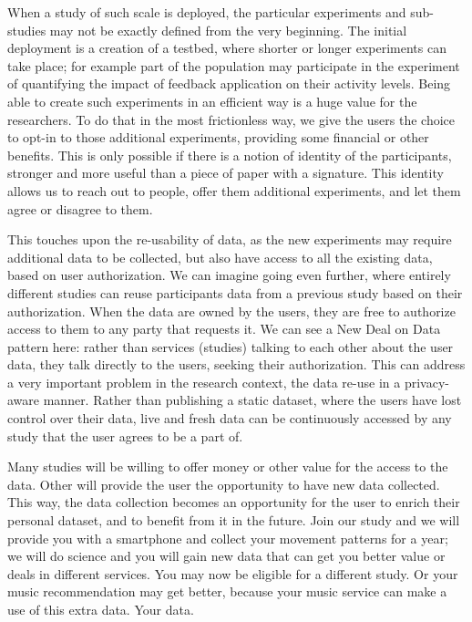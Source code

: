 When a study of such scale is deployed, the particular experiments and sub-studies may not be exactly defined from the very beginning.
The initial deployment is a creation of a testbed, where shorter or longer experiments can take place; for example part of the population may participate in the experiment of quantifying the impact of feedback application on their activity levels.
Being able to create such experiments in an efficient way is a huge value for the researchers. To do that in the most frictionless way, we give the users the choice to opt-in to those additional experiments, providing some financial or other benefits.
This is only possible if there is a notion of identity of the participants, stronger and more useful than a piece of paper with a signature.
This identity allows us to reach out to people, offer them additional experiments, and let them agree or disagree to them.

This touches upon the re-usability of data, as the new experiments may require additional data to be collected, but also have access to all the existing data, based on user authorization.
We can imagine going even further, where entirely different studies can reuse participants data from a previous study based on their authorization.
When the data are owned by the users, they are free to authorize access to them to any party that requests it. We can see a New Deal on Data pattern here: rather than services (studies) talking to each other about the user data, they talk directly to the users, seeking their authorization.
This can address a very important problem in the research context, the data re-use in a privacy-aware manner.
Rather than publishing a static dataset, where the users have lost control over their data, live and fresh data can be continuously accessed by any study that the user agrees to be a part of.

Many studies will be willing to offer money or other value for the access to the data.
Other will provide the user the opportunity to have new data collected.
This way, the data collection becomes an opportunity for the user to enrich their personal dataset, and to benefit from it in the future.
Join our study and we will provide you with a smartphone and collect your movement patterns for a year; we will do science and you will gain new data that can get you better value or deals in different services.
You may now be eligible for a different study.
Or your music recommendation may get better, because your music service can make a use of this extra data.
Your data.

